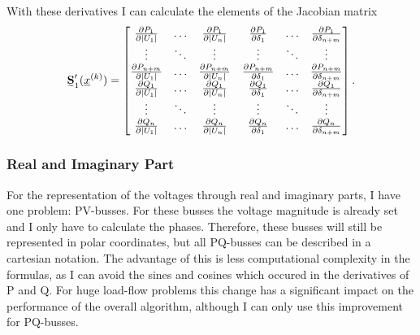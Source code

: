 With these derivatives I can calculate the elements of the Jacobian matrix
\begin{equation}
	\mat S_1' (\vec x^{(k)}) = 
	\begin{bmatrix}
		\frac{\partial P_1}{\partial |U_1|}	& \hdots	& \frac{\partial P_1}{\partial |U_n|}	& \frac{\partial P_1}{\partial \delta_1}	& \hdots	& \frac{\partial P_1}{\partial \delta_{n + m}} \\
		\vdots								& \ddots	& \vdots								& \vdots									& \ddots	& \vdots \\
		\frac{\partial P_{n + m}}{\partial |U_1|}	& \hdots	& \frac{\partial P_{n + m}}{\partial |U_n|}	& \frac{\partial P_{n + m}}{\partial \delta_1}	& \hdots	& \frac{\partial P_{n + m}}{\partial \delta_{n + m}} \\
		\frac{\partial Q_1}{\partial |U_1|}	& \hdots	& \frac{\partial Q_1}{\partial |U_n|}	& \frac{\partial Q_1}{\partial \delta_1}	& \hdots	& \frac{\partial Q_1}{\partial \delta_{n + m}} \\
		\vdots								& \ddots	& \vdots								& \vdots									& \ddots	& \vdots \\
		\frac{\partial Q_n}{\partial |U_1|}	& \hdots	& \frac{\partial Q_n}{\partial |U_n|}	& \frac{\partial Q_n}{\partial \delta_1}	& \hdots	& \frac{\partial Q_n}{\partial \delta_{n + m}}
	\end{bmatrix}.
	\label{eq:power_jacobian_newton_raphson}
\end{equation}

\subsubsection{Real and Imaginary Part}
For the representation of the voltages through real and imaginary parts, I have one problem: PV-busses. For these busses the voltage magnitude is already set and I only have to calculate the phases. Therefore, these busses will still be represented in polar coordinates, but all PQ-busses can be described in a cartesian notation. The advantage of this is less computational complexity in the formulas, as I can avoid the sines and cosines which occured in the derivatives of P and Q. For huge load-flow problems this change has a significant impact on the performance of the overall algorithm, although I can only use this improvement for PQ-busses.

